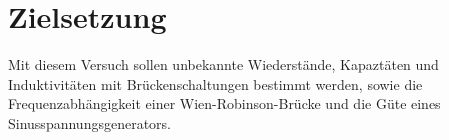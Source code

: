 \section{Zielsetzung}
\label{sec:Zielsetzung}
Mit diesem Versuch sollen unbekannte Wiederstände, Kapaztäten und Induktivitäten
mit Brückenschaltungen bestimmt werden, sowie die Frequenzabhängigkeit einer
Wien-Robinson-Brücke und die Güte eines Sinusspannungsgenerators.
